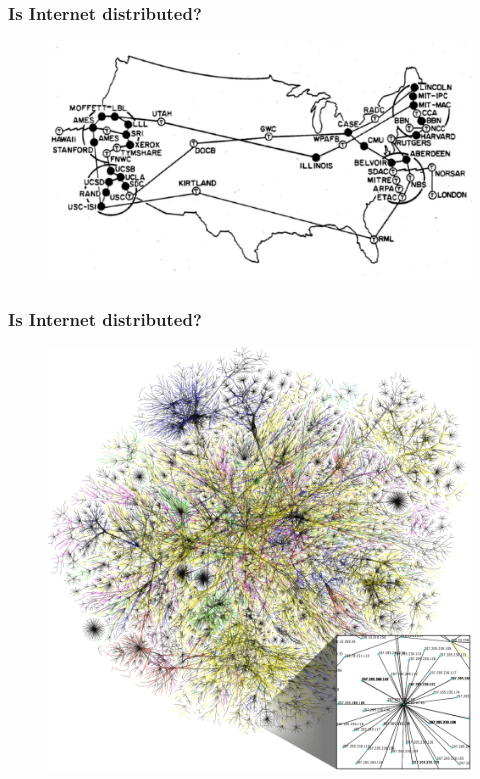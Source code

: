\begin{frame}
\frametitle{ Is Internet distributed? }
  \begin{figure}[h]
  \centering
  \includegraphics[height=0.5\linewidth]{arpa-1970.png}
  \end{figure}
\end{frame}

\begin{frame}
\frametitle{ Is Internet distributed? }
  \begin{figure}[h]
  \centering
  \includegraphics[height=0.5\linewidth]{web-img.png}
  \end{figure}
\end{frame}

